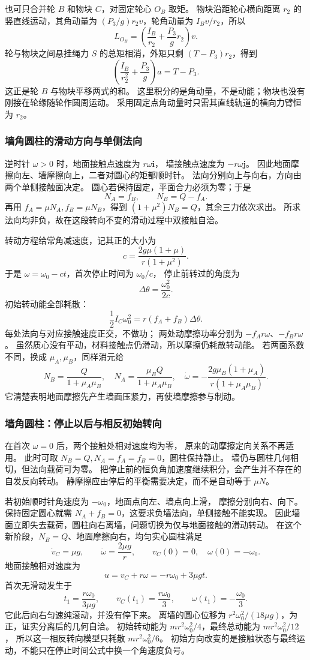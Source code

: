 \documentclass[UTF8,zihao=-4,fontset=fandol,a4paper]{ctexart}
\newcommand{\vect}[1]{\bm{#1}}
\begin{document}
也可只合并轮 $B$ 和物块 $C$，对固定轮心 $O_B$ 取矩。
物块沿距轮心横向距离 $r_2$ 的竖直线运动，其角动量为
$(P_3/g)r_2v$，轮角动量为 $I_Bv/r_2$，所以
\[
L_{O_B}=\left(\frac{I_B}{r_2}+\frac{P_3}{g}r_2\right)v.
\]
轮与物块之间悬挂绳力 $S$ 的总矩相消，外矩只剩 $(T-P_3)r_2$，得到
\[
\left(\frac{I_B}{r_2^2}+\frac{P_3}{g}\right)a=T-P_3.
\]
这正是轮 $B$ 与物块平移两式的和。
这里积分的是角动量，不是动能；物块也没有刚接在轮缘随轮作圆周运动。
采用固定点角动量时只需其直线轨道的横向力臂恒为 $r_2$。

\subsubsection*{墙角圆柱的滑动方向与单侧法向}
逆时针 $\omega>0$ 时，地面接触点速度为 $r\omega\vect i$，
墙接触点速度为 $-r\omega\vect j$。
因此地面摩擦向左、墙摩擦向上，二者对圆心的矩都顺时针。
法向分别向上与向右，方向由两个单侧接触面决定。
圆心若保持固定，平面合力必须为零；于是
\[
N_A=f_B,\qquad N_B=Q-f_A.
\]
再用 $f_A=\mu N_A,f_B=\mu N_B$，得到
$(1+\mu^2)N_B=Q$，其余三力依次求出。
所求法向均非负，故在这段转向不变的滑动过程中双接触自洽。

转动方程给常角减速度，记其正的大小为
\[
c=\frac{2g\mu(1+\mu)}{r(1+\mu^2)}.
\]
于是 $\omega=\omega_0-ct$，首次停止时间为 $\omega_0/c$，
停止前转过的角度为
\[
\Delta\theta=\frac{\omega_0^2}{2c}.
\]
初始转动能全部耗散：
\[
\frac12I_C\omega_0^2=r(f_A+f_B)\Delta\theta.
\]
每处法向与对应接触速度正交，不做功；
两处动摩擦功率分别为 $-f_Ar\omega$、$-f_Br\omega$。
虽然质心没有平动，材料接触点仍滑动，所以摩擦仍耗散转动能。
若两面系数不同，换成 $\mu_A,\mu_B$，同样消元给
\[
N_B=\frac Q{1+\mu_A\mu_B},\quad
N_A=\frac{\mu_BQ}{1+\mu_A\mu_B},\quad
\dot\omega=-\frac{2g\mu_B(1+\mu_A)}{r(1+\mu_A\mu_B)}.
\]
它清楚表明地面摩擦先产生墙面压紧力，再使墙摩擦参与制动。

\subsubsection*{墙角圆柱：停止以后与相反初始转向}
在首次 $\omega=0$ 后，两个接触处相对速度均为零，
原来的动摩擦定向关系不再适用。
此时可取 $N_B=Q,N_A=f_A=f_B=0$，圆柱保持静止。
墙仍与圆柱几何相切，但法向载荷可为零。
把停止前的恒负角加速度继续积分，会产生并不存在的自发反向转动。
静摩擦应由停后的平衡需要决定，而不是自动等于 $\mu N$。

若初始顺时针角速度为 $-\omega_0$，地面点向左、墙点向上滑，
摩擦分别向右、向下。
保持固定圆心就需 $N_A+f_B=0$，这要求负墙法向，单侧接触不能实现。
因此墙面立即失去载荷，圆柱向右离墙，问题切换为仅与地面接触的滑动转动。
在这个新阶段，$N_B=Q$、地面摩擦向右，均匀实心圆柱满足
\[
\dot v_C=\mu g,\qquad \dot\omega=\frac{2\mu g}{r},
\qquad v_C(0)=0,\quad\omega(0)=-\omega_0.
\]
地面接触相对速度为
\[
u=v_C+r\omega=-r\omega_0+3\mu gt.
\]
首次无滑动发生于
\[
t_1=\frac{r\omega_0}{3\mu g},\qquad
v_C(t_1)=\frac{r\omega_0}{3},\qquad
\omega(t_1)=-\frac{\omega_0}{3}.
\]
它此后向右匀速纯滚动，并没有停下来。
离墙的圆心位移为 $r^2\omega_0^2/(18\mu g)$，为正，证实分离后的几何自洽。
初始转动能为 $mr^2\omega_0^2/4$，最终总动能为 $mr^2\omega_0^2/12$，
所以这一相反转向模型只耗散 $mr^2\omega_0^2/6$。
初始方向改变的是接触状态与最终运动，不能只在停止时间公式中换一个角速度负号。
\end{document}
